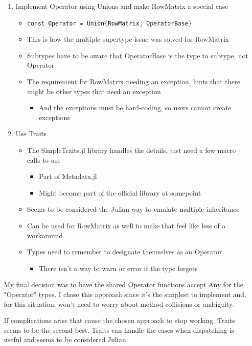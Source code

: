 \documentclass{article}
\begin{document}
\begin{enumerate}
	\item Implement Operator using Unions and make RowMatrix a special case
	\begin{itemize}
		\item \verb|const Operator = Union{RowMatrix, OperatorBase}|
		\item This is how the multiple supertype issue was solved for RowMatrix
		\item Subtypes have to be aware that OperatorBase is the type to subtype, not Operator
		\item The requirement for RowMatrix needing an exception, hints that there might be other types that need an exception
		\begin{itemize}
			\item And the exceptions must be hard-coding, so users cannot create exceptions
		\end{itemize}
	\end{itemize}		 

	\item Use Traits
	\begin{itemize}
		\item The SimpleTraits.jl library handles the details, just need a few macro calls to use
		\begin{itemize}
			\item Part of Metadata.jl
			\item Might become part of the official library at somepoint
		\end{itemize}
		\item Seems to be considered the Julian way to emulate multiple inheritance
		\item Can be used for RowMatrix as well to make that feel like less of a workaround
		\item Types need to remember to designate themselves as an Operator
		\begin{itemize}
			\item There isn't a way to warn or error if the type forgets
		\end{itemize}
	\end{itemize}
\end{enumerate}

My final decision was to have the shared Operator functions accept Any for the "Operator" types.  I chose this approach since it's the simplest to implement and, for this situation, won't need to worry about method collisions or ambiguity.

If complications arise that cause the chosen approach to stop working, Traits seems to be the second best.  Traits can handle the cases when dispatching is useful and seems to be considered Julian.
\end{document}

